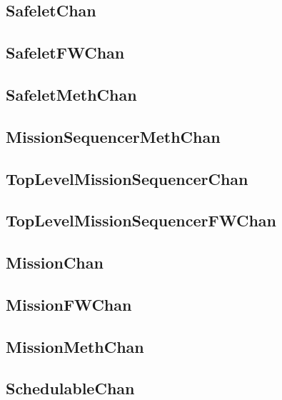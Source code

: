 \documentclass{article}
\begin{document}
\begin{plumbing}
\subsection{SafeletChan}


\subsection{SafeletFWChan}


\subsection{SafeletMethChan}


\subsection{MissionSequencerMethChan}


\subsection{TopLevelMissionSequencerChan}


\subsection{TopLevelMissionSequencerFWChan}


\subsection{MissionChan}


\subsection{MissionFWChan}


\subsection{MissionMethChan}


\subsection{SchedulableChan}



\end{plumbing}
\end{document}
